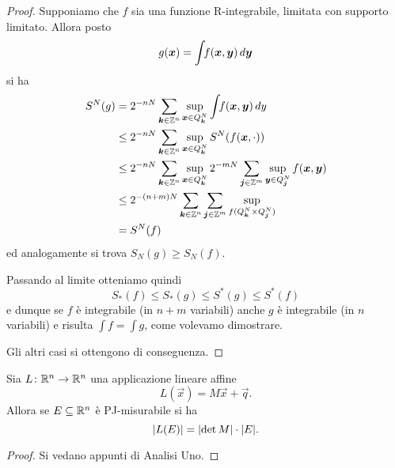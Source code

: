 \begin{proof}
Supponiamo che $f$ sia una funzione R-integrabile, 
limitata con supporto limitato.
Allora posto 
\[
    g(\vec x) = \int\!\! f(\vec x, \vec y)\, d\vec y\\
\]
si ha
\begin{align*}
    S^N(g)
    &= 2^{-nN} \sum_{\vec k\in \ZZ^n} 
        \sup_{\vec x\in Q^N_{\vec k}}
            \int\!\! f(\vec x,\vec y)\, dy\\
    &\le 2^{-nN} \sum_{\vec k\in \ZZ^n} 
        \sup_{\vec x\in Q^N_{\vec k}}
                S^N(f(\vec x,\cdot))\\
    &\le 2^{-nN} \sum_{\vec k\in \ZZ^n} 
        \sup_{\vec x\in Q^N_{\vec k}}
            2^{-mN} \sum_{\vec j \in \ZZ^m} 
                \sup_{\vec y \in Q^N_{\vec j}} 
                    f(\vec x, \vec y) \\
    &\le 2^{-(n+m)N} \sum_{\vec k\in \ZZ^n} 
        \sum_{\vec j \in \ZZ^m} 
            \sup_{f(Q^N_{\vec k}\times Q^N_{\vec j})}\\
    &= S^N(f)
\end{align*}
ed analogamente si trova $S_N(g) \ge S_N(f)$.

Passando al limite otteniamo quindi 
\[
   S_*(f) \le S_*(g) \le S^*(g) \le S^*(f)
\]
e dunque se $f$ è integrabile (in $n+m$ variabili) anche $g$ è integrabile
(in $n$ variabili) 
e risulta $\int f = \int g$, come volevamo dimostrare.

Gli altri casi si ottengono di conseguenza.
\end{proof}

\begin{theorem}
  \label{th:geometria_determinante}
Sia $L\colon \RR^n\to \RR^n$ una applicazione lineare affine
\[
  L(\vec x) = M\vec x + \vec q.
\]
Allora se $E\subset \RR^n$ è PJ-misurabile si ha 
\[
  \abs{L(E)} = \abs{\det M} \cdot \abs{E}.
\]
\end{theorem}
\begin{proof}
Si vedano appunti di Analisi Uno.
\end{proof}

